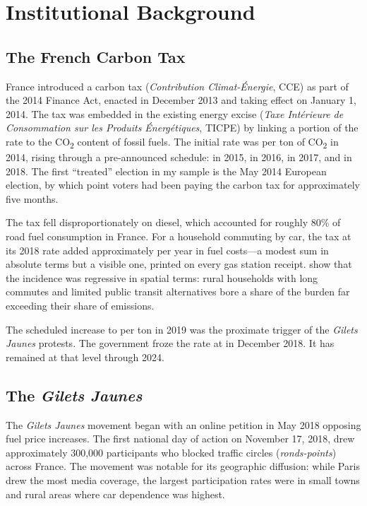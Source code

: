 \documentclass[12pt]{article}
\providecommand{\euro}{\texteuro}
\newcommand{\gj}{\textit{Gilets Jaunes}}
\begin{document}
\section{Institutional Background}
\label{sec:background}

\subsection{The French Carbon Tax}

France introduced a carbon tax (\textit{Contribution Climat-\'{E}nergie}, CCE) as part of the 2014 Finance Act, enacted in December 2013 and taking effect on January 1, 2014. The tax was embedded in the existing energy excise (\textit{Taxe Int\'{e}rieure de Consommation sur les Produits \'{E}nerg\'{e}tiques}, TICPE) by linking a portion of the rate to the CO\textsubscript{2} content of fossil fuels. The initial rate was \euro 7 per ton of CO\textsubscript{2} in 2014, rising through a pre-announced schedule: \euro 14.50 in 2015, \euro 22 in 2016, \euro 30.50 in 2017, and \euro 44.60 in 2018. The first ``treated'' election in my sample is the May 2014 European election, by which point voters had been paying the carbon tax for approximately five months.

The tax fell disproportionately on diesel, which accounted for roughly 80\% of road fuel consumption in France. For a household commuting by car, the tax at its 2018 rate added approximately \euro 120 per year in fuel costs---a modest sum in absolute terms but a visible one, printed on every gas station receipt. \citet{bureau2019distributional} show that the incidence was regressive in spatial terms: rural households with long commutes and limited public transit alternatives bore a share of the burden far exceeding their share of emissions.

The scheduled increase to \euro 55 per ton in 2019 was the proximate trigger of the \gj{} protests. The government froze the rate at \euro 44.60 in December 2018. It has remained at that level through 2024.

\subsection{The \textit{Gilets Jaunes}}

The \gj{} movement began with an online petition in May 2018 opposing fuel price increases. The first national day of action on November 17, 2018, drew approximately 300,000 participants who blocked traffic circles (\textit{ronds-points}) across France. The movement was notable for its geographic diffusion: while Paris drew the most media coverage, the largest participation rates were in small towns and rural areas where car dependence was highest.
\end{document}
